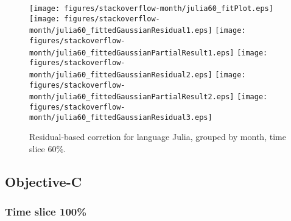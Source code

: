 \begin{figure}[hb]
\centering
{}
{\texttt{[image: figures/stackoverflow-month/julia60\_fitPlot.eps]}}
{\texttt{[image: figures/stackoverflow-month/julia60\_fittedGaussianResidual1.eps]}}
{\texttt{[image: figures/stackoverflow-month/julia60\_fittedGaussianPartialResult1.eps]}}
{\texttt{[image: figures/stackoverflow-month/julia60\_fittedGaussianResidual2.eps]}}
{\texttt{[image: figures/stackoverflow-month/julia60\_fittedGaussianPartialResult2.eps]}}
{\texttt{[image: figures/stackoverflow-month/julia60\_fittedGaussianResidual3.eps]}}
\caption{Residual-based corretion for language Julia, grouped by month, time slice 60\%.}
\end{figure}


\clearpage 
\newpage 


\subsection{Objective-C}

\FloatBarrier

\subsubsection{Time slice 100\%}

